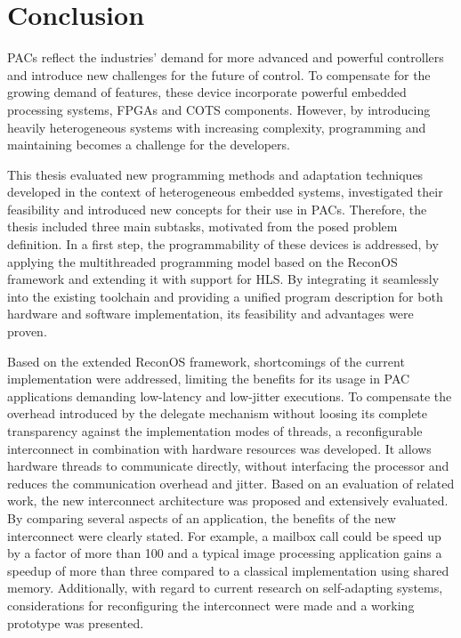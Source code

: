 \chapter{Conclusion}
\label{sec:conclusion}
\aclp{PAC} reflect the industries' demand for more advanced and powerful
controllers and introduce new challenges for the future of control. To
compensate for the growing demand of features, these device incorporate
powerful embedded processing systems, \acp{FPGA} and \ac{COTS} components.
However, by introducing heavily heterogeneous systems with increasing
complexity, programming and maintaining becomes a challenge for the
developers.

This thesis evaluated new programming methods and adaptation
techniques developed in the context of heterogeneous embedded systems,
investigated their feasibility and introduced new concepts for their use in
\acp{PAC}. Therefore, the thesis included three main subtasks, motivated from
the posed problem definition. In a first step, the programmability of these
devices is addressed, by applying the multithreaded programming model based on
the ReconOS framework and extending it with support for \ac{HLS}. By
integrating it seamlessly into the existing toolchain and providing a unified
program description for both hardware and software implementation, its
feasibility and advantages were proven.

Based on the extended ReconOS framework, shortcomings of the current
implementation were addressed, limiting the benefits for its usage in
\ac{PAC} applications demanding low-latency and low-jitter executions. To
compensate the overhead introduced by the delegate mechanism without loosing
its complete transparency against the implementation modes of threads, a
reconfigurable interconnect in combination with hardware resources was
developed. It allows hardware threads to communicate directly, without
interfacing the processor and reduces the communication overhead and jitter.
Based on an evaluation of related work, the new interconnect architecture was
proposed and extensively evaluated. By comparing several aspects of an
application, the benefits of the new interconnect were clearly stated. For
example, a mailbox call could be speed up by a factor of more than 100 and a
typical image processing application gains a speedup of more than three
compared to a classical implementation using shared memory. Additionally, with
regard to current research on self-adapting systems, considerations for
reconfiguring the interconnect were made and a working prototype was
presented.

